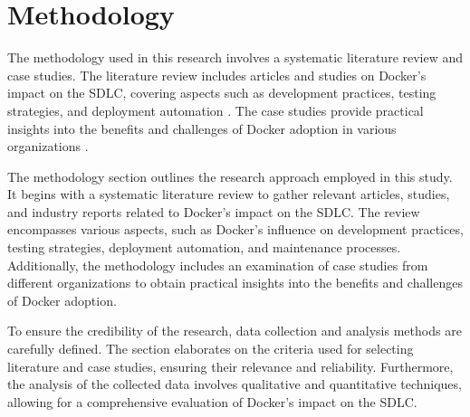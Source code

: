 \section{Methodology}

The methodology used in this research involves a systematic literature review and case studies. The literature review includes articles and studies on Docker's impact on the SDLC, covering aspects such as development practices, testing strategies, and deployment automation \citep{raffa2018docker,pahl2015containers}. The case studies provide practical insights into the benefits and challenges of Docker adoption in various organizations \citep{neamtiu2013towards}.

The methodology section outlines the research approach employed in this study. It begins with a systematic literature review to gather relevant articles, studies, and industry reports related to Docker's impact on the SDLC. The review encompasses various aspects, such as Docker's influence on development practices, testing strategies, deployment automation, and maintenance processes. Additionally, the methodology includes an examination of case studies from different organizations to obtain practical insights into the benefits and challenges of Docker adoption.

To ensure the credibility of the research, data collection and analysis methods are carefully defined. The section elaborates on the criteria used for selecting literature and case studies, ensuring their relevance and reliability. Furthermore, the analysis of the collected data involves qualitative and quantitative techniques, allowing for a comprehensive evaluation of Docker's impact on the SDLC.

